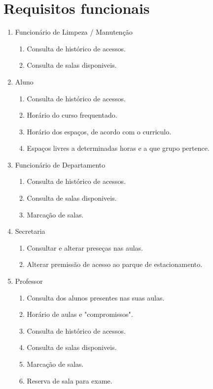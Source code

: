 \documentclass[a4paper]{report}
\begin{document}
\section{Requisitos funcionais}
\begin{enumerate}
\item Funcionário de Limpeza / Manutenção
	\begin{enumerate}
    \item Consulta de histórico de acessos.
    \item Consulta de salas disponiveis.
	\end{enumerate}
\item Aluno
	\begin{enumerate}
	\item Consulta de histórico de acessos.
    \item Horário do curso frequentado.
    \item Horário dos espaços, de acordo com o curriculo.
    \item Espaços livres a determinadas horas e a que grupo pertence.
	\end{enumerate}
\item Funcionário de Departamento
	\begin{enumerate}
    \item Consulta de histórico de acessos.
    \item Consulta de salas disponiveis.
    \item Marcação de salas.
	\end{enumerate}
\item Secretaria
	\begin{enumerate}
    \item Consultar e alterar preseças nas aulas.
    \item Alterar premissão de acesso ao parque de estacionamento.
	\end{enumerate}
\item Professor
	\begin{enumerate}
	\item Consulta dos alunos presentes nas suas aulas.
    \item Horário de aulas e "compromissos".
    \item Consulta de histórico de acessos.
    \item Consulta de salas disponiveis.
    \item Marcação de salas.
    \item Reserva de sala para exame.
	\end{enumerate}

\end{enumerate}
\end{document}
